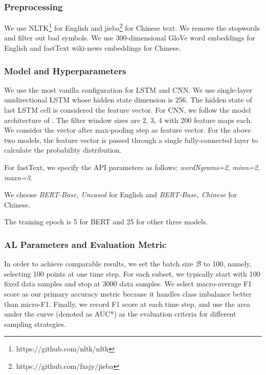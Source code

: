 
\subsubsection{Preprocessing}
We use NLTK\footnote{https://github.com/nltk/nltk} for English and jieba\footnote{https://github.com/fxsjy/jieba} for Chinese text.
We remove the stopwords and filter out bad symbols. 
We use 300-dimensional GloVe word embeddings \cite{pennington2014glove} 
for English and fastText wiki-news embeddings \cite{mikolov2018advances} for Chinese.

\subsubsection{Model and Hyperparameters}
We use the most vanilla configuration for LSTM and CNN. We use single-layer unidirectional LSTM whose hidden state dimension is 256. The hidden state of last LSTM cell is considered the feature vector. For CNN, we follow the model architecture of \cite{kim2014convolutional}. The filter window sizes are 2, 3, 4 with 200 feature maps each. We consider the vector after max-pooling step as feature vector. For the above two models, the feature vector is passed through a single fully-connected layer to calculate the probability distribution. 

For fastText, we specify the API parameters as follows: \emph{wordNgrams=2, minn=2, maxn=3}. 

We choose \emph{BERT-Base, Uncased} for English and \emph{BERT-Base, Chinese} for Chinese.

The training epoch is 5 for BERT and 25 for other three models.


\subsubsection{AL Parameters and Evaluation Metric}

In order to achieve comparable results, we set the batch size $\mathcal{B}$ to 100, namely, selecting 100 points at one time step. For each subset, we typically start with 100 fixed data samples and stop at 3000 data samples. 
We select macro-average F1 score as our primary accuracy metric because it handles
class imbalance better than micro-F1. Finally, we record F1 score at each time step, 
and use the area under the curve (denoted as AUC*) as the evaluation criteria for different
sampling strategies. 

